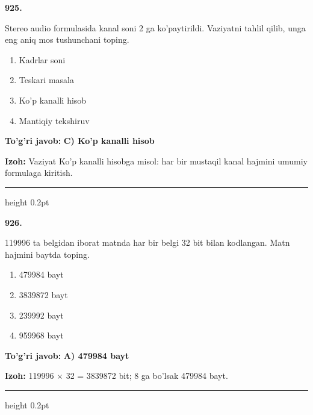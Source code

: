 \documentclass[10pt,a4paper,oneside]{article}
\begin{document}
\noindent\textbf{\color{ink}925.}
\par
Stereo audio formulasida kanal soni 2 ga ko'paytirildi. Vaziyatni tahlil qilib, unga eng aniq mos tushunchani toping.
\begin{enumerate}[label=\Alph*),leftmargin=9mm]
\item Kadrlar soni
\item Teskari masala
\item Ko'p kanalli hisob
\item Mantiqiy tekshiruv
\end{enumerate}
\begin{tcolorbox}[enhanced,breakable,colback=teal!4,colframe=teal!50!black,boxrule=0.5pt,arc=1.1mm,left=3mm,right=3mm,top=1.7mm,bottom=1.7mm,before skip=2mm,after skip=2mm]
\textbf{\color{teal}To'g'ri javob:} \textbf{C) Ko'p kanalli hisob}
\par\smallskip
\textbf{Izoh:} Vaziyat Ko'p kanalli hisobga misol: har bir mustaqil kanal hajmini umumiy formulaga kiritish.
\end{tcolorbox}
\vspace{2mm}\hrule height 0.2pt \vspace{3mm}

\noindent\textbf{\color{ink}926.}
\par
119996 ta belgidan iborat matnda har bir belgi 32 bit bilan kodlangan. Matn hajmini baytda toping.
\begin{enumerate}[label=\Alph*),leftmargin=9mm]
\item 479984 bayt
\item 3839872 bayt
\item 239992 bayt
\item 959968 bayt
\end{enumerate}
\begin{tcolorbox}[enhanced,breakable,colback=teal!4,colframe=teal!50!black,boxrule=0.5pt,arc=1.1mm,left=3mm,right=3mm,top=1.7mm,bottom=1.7mm,before skip=2mm,after skip=2mm]
\textbf{\color{teal}To'g'ri javob:} \textbf{A) 479984 bayt}
\par\smallskip
\textbf{Izoh:} 119996 \ensuremath{\times} 32 = 3839872 bit; 8 ga bo'lsak 479984 bayt.
\end{tcolorbox}
\vspace{2mm}\hrule height 0.2pt \vspace{3mm}
\end{document}
